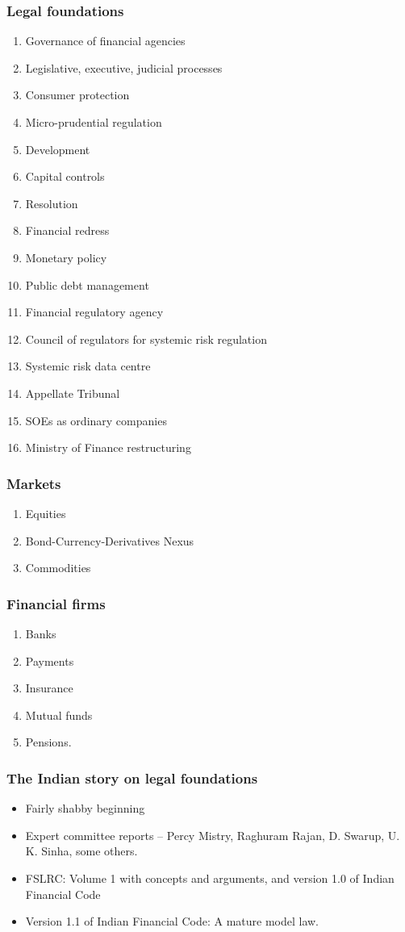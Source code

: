 \documentclass{beamer}
\begin{document}
\begin{frame}
  \frametitle{Legal foundations}
  \begin{enumerate}
  \item Governance of financial agencies
  \item Legislative, executive, judicial processes
  \item Consumer protection
  \item Micro-prudential regulation
  \item Development
  \item Capital controls
  \item Resolution 
  \item Financial redress
  \item Monetary policy
  \item Public debt management
  \item Financial regulatory agency
  \item Council of regulators for systemic risk regulation
  \item Systemic risk data centre
  \item Appellate Tribunal
  \item SOEs as ordinary companies
  \item Ministry of Finance restructuring
  \end{enumerate}
\end{frame}
\begin{frame}
  \frametitle{Markets}
  \begin{enumerate}
  \item Equities
  \item Bond-Currency-Derivatives Nexus
  \item Commodities
  \end{enumerate}
\end{frame}
\begin{frame}
  \frametitle{Financial firms}
  \begin{enumerate}
  \item Banks
  \item Payments
  \item Insurance
  \item Mutual funds
  \item Pensions.
  \end{enumerate}
\end{frame}

\begin{frame}
  \frametitle{The Indian story on legal foundations}
  \begin{itemize}
  \item Fairly shabby beginning
  \item Expert committee reports -- Percy Mistry, Raghuram Rajan,
    D. Swarup, U. K. Sinha, some others.
  \item FSLRC: Volume 1 with concepts and arguments, and version 1.0
    of Indian Financial Code
  \item Version 1.1 of Indian Financial Code: A mature model law.
  \end{itemize}
\end{frame}
\end{document}
